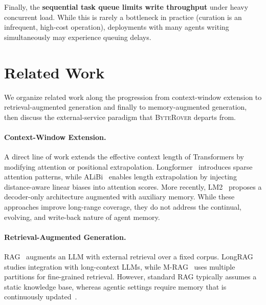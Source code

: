 \documentclass[11pt]{article}
\newcommand{\byterover}{\textsc{ByteRover}}
\begin{document}
Finally, the \textbf{sequential task queue limits write throughput}
under heavy concurrent load.
While this is rarely a bottleneck in practice
(curation is an infrequent, high-cost operation),
deployments with many agents writing simultaneously may experience queuing delays.






\clearpage
\appendix

\section{Related Work}
\label{app:related-work}

We organize related work along the progression from context-window extension
to retrieval-augmented generation and finally to memory-augmented generation,
then discuss the external-service paradigm that \byterover{} departs from.

\paragraph{Context-Window Extension.}
A direct line of work extends the effective context length of Transformers
by modifying attention or positional extrapolation.
Longformer~\citep{beltagy2020longformer} introduces sparse attention patterns,
while ALiBi~\citep{press2021train} enables length extrapolation
by injecting distance-aware linear biases into attention scores.
More recently, LM2~\citep{kang2025lm2} proposes a decoder-only architecture
augmented with auxiliary memory.
While these approaches improve long-range coverage,
they do not address the continual, evolving, and write-back nature of agent memory.

\paragraph{Retrieval-Augmented Generation.}
RAG~\citep{lewis2020rag} augments an LLM with external retrieval over a fixed corpus.
LongRAG~\citep{jiang2024longrag} studies integration with long-context LLMs,
while M-RAG~\citep{wang2024mrag} uses multiple partitions for fine-grained retrieval.
However, standard RAG typically assumes a static knowledge base,
whereas agentic settings require memory that is continuously updated~\citep{gutierrez2025rag2memory}.
\end{document}
